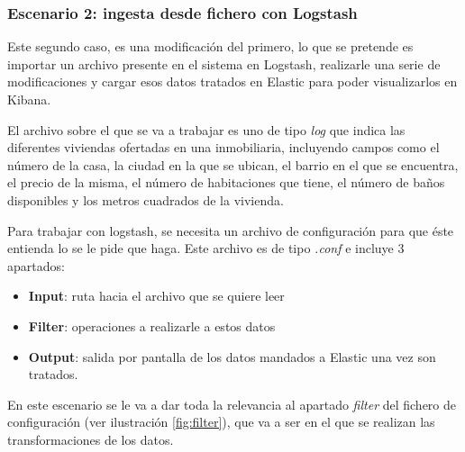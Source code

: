 \paragraph{}
\paragraph{}
\paragraph{}

\subsubsection{Escenario 2: ingesta desde fichero con Logstash}

Este segundo caso, es una modificación del primero, lo que se pretende es importar un archivo presente en el sistema en Logstash, realizarle una serie de modificaciones y cargar esos datos tratados en Elastic para poder visualizarlos en Kibana.

El archivo sobre el que se va a trabajar es uno de tipo \textit{log} que indica las diferentes viviendas ofertadas en una inmobiliaria, incluyendo campos como el número de la casa, la ciudad en la que se ubican, el barrio en el que se encuentra, el precio de la misma, el número de habitaciones que tiene, el número de baños disponibles y los metros cuadrados de la vivienda.

Para trabajar con logstash, se necesita un archivo de configuración para que éste entienda lo se le pide que haga. Este archivo es de tipo \textit{.conf} e incluye 3 apartados:
\begin{itemize}
    \item \textbf{Input}: ruta hacia el archivo que se quiere leer
    \item \textbf{Filter}: operaciones a realizarle a estos datos
    \item \textbf{Output}: salida por pantalla de los datos mandados a Elastic una vez son tratados.
\end{itemize}

En este escenario se le va a dar toda la relevancia al apartado \textit{filter} del fichero de configuración  (ver ilustración   \ref{fig:filter}), que va a ser en el que se realizan las transformaciones de los datos. 

